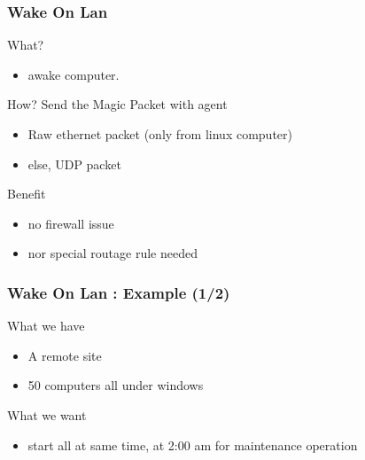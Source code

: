 \documentclass{beamer}
\begin{document}
\begin{frame}
    \frametitle{Wake On Lan}

    \begin{block}{What?}
    \begin{itemize}
        \item awake computer.
    \end{itemize}
    \end{block}

\pause

    \begin{block}{How?}
        Send the Magic Packet with agent
    \begin{itemize}
	\item Raw ethernet packet (only from linux computer)
	\item else, UDP packet
    \end{itemize}
    \end{block}

\pause

    \begin{block}{Benefit}
    \begin{itemize}
        \item no firewall issue
        \item nor special routage rule needed
    \end{itemize}
    \end{block}

\end{frame}

\begin{frame}
    \frametitle{Wake On Lan : Example (1/2)}

    \begin{block}{What we have}
    \begin{itemize}
    \item A remote site
    \item 50 computers all under windows
    \end{itemize}
    \end{block}


    \begin{block}{What we want}
    \begin{itemize}
    \item start all at same time, at 2:00 am for maintenance operation
    \end{itemize}
    \end{block}

\end{frame}
\end{document}
